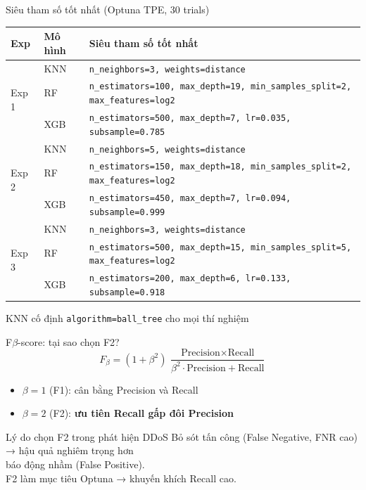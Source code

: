 \documentclass[aspectratio=169,12pt]{beamer}
\newcommand{\sidenote}[1]{\textcolor{mygray}{\small #1}}
\begin{document}
\begin{frame}{Siêu tham số tốt nhất (Optuna TPE, 30 trials)}
  \begin{table}
    \centering
    \small
    \begin{tabular}{llp{7.5cm}}
      \toprule
      \textbf{Exp} & \textbf{Mô hình} & \textbf{Siêu tham số tốt nhất}\\
      \midrule
      \multirow{3}{*}{Exp 1}
        & KNN  & \texttt{n\_neighbors=3, weights=distance} \\
        & RF   & \texttt{n\_estimators=100, max\_depth=19, min\_samples\_split=2, max\_features=log2} \\
        & XGB  & \texttt{n\_estimators=500, max\_depth=7, lr=0.035, subsample=0.785} \\
      \midrule
      \multirow{3}{*}{Exp 2}
        & KNN  & \texttt{n\_neighbors=5, weights=distance} \\
        & RF   & \texttt{n\_estimators=150, max\_depth=18, min\_samples\_split=2, max\_features=log2} \\
        & XGB  & \texttt{n\_estimators=450, max\_depth=7, lr=0.094, subsample=0.999} \\
      \midrule
      \multirow{3}{*}{Exp 3}
        & KNN  & \texttt{n\_neighbors=3, weights=distance} \\
        & RF   & \texttt{n\_estimators=500, max\_depth=15, min\_samples\_split=5, max\_features=log2} \\
        & XGB  & \texttt{n\_estimators=200, max\_depth=6, lr=0.133, subsample=0.918} \\
      \bottomrule
    \end{tabular}
  \end{table}
  \sidenote{KNN cố định \texttt{algorithm=ball\_tree} cho mọi thí nghiệm}
\end{frame}

\begin{frame}{F$\beta$-score: tại sao chọn F2?}
  \[
    F_\beta = (1+\beta^2)\, \frac{\text{Precision} \times \text{Recall}}{\beta^2 \cdot \text{Precision} + \text{Recall}}
  \]
  \begin{itemize}
    \item $\beta = 1$ (F1): cân bằng Precision và Recall
    \item $\beta = 2$ (F2): \textbf{ưu tiên Recall gấp đôi Precision}
  \end{itemize}
  \vspace{0.5em}
  \begin{block}{Lý do chọn F2 trong phát hiện DDoS}
    Bỏ sót tấn công (False Negative, FNR cao) → hậu quả nghiêm trọng hơn\\
    báo động nhầm (False Positive).\\
    F2 làm mục tiêu Optuna → khuyến khích Recall cao.
  \end{block}
\end{frame}
\end{document}
